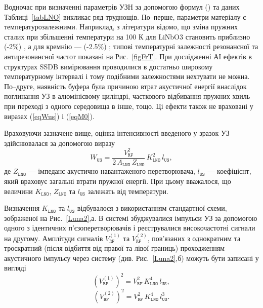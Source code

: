 Водночас при визначенні параметрів УЗН за допомогою формул () та даних Таблиці~\ref{tabLNO} викликає ряд труднощів.
По--перше, параметри матеріалу є температурозалежними.
Наприклад, з літератури відомо, що зміна пружних сталих при збільшенні температури на 100 К для LiNbO3 становить приблизно (-2\%) \cite{LNO_C:Temp},
а для кремнію --- (-2.5\%) \cite{Si_C:Temp};
типові температурні залежності резонансної та антирезонансної частот показані на Рис.~\ref{figFrT}.
При дослідженні АІ ефектів в структурах SSDB вимірювання проводилися в достатньо широкому температурному інтервалі і тому подібними залежностями нехтувати не можна.
По--друге, наявність буфера була причиною втрат акустичної енергії внаслідок поглинання УЗ в алюмінієвому циліндрі, часткового відбивання пружних хвиль
при переході з одного середовища в інше, тощо.
Ці ефекти також не враховані у виразах (\ref{eqWus}) і  (\ref{eqM0}).



Враховуючи зазначене вище, оцінка інтенсивності введеного у зразок УЗ здійснювалася за допомогою виразу
 \begin{equation}
 \label{eqWus2}
 W_\mathtt{US}=\frac{V_\mathtt{RF}^2}{2\,A_\mathtt{LNO}\,Z_\mathtt{LNO}}\,K_\mathtt{LNO}^2\,l_\mathtt{US},
 \end{equation}
де
$Z_\mathtt{LNO}$ --- імпеданс акустично навантаженого перетворювача,
$l_\mathtt{US}$ --- коефіцієнт, який враховує загальні втрати пружної енергії.
При цьому вважалося, що величини
$K_\mathtt{LNO}$, $Z_\mathtt{LNO}$ та $l_\mathtt{US}$ залежать від температури.

Визначення $K_\mathtt{LNO}$ та $l_\mathtt{US}$ відбувалося з використанням стандартної схеми,
зображеної на Рис.~\ref{Luna2},а.
В системі збуджувалися імпульси УЗ за допомогою одного з ідентичних п'єзоперетворювачів і реєструвалися
високочастотні сигнали на другому.
Амплітуди сигналів $V_\mathtt{RF}^{(1)}$ та $V_\mathtt{RF}^{(2)}$, пов'язаних з однократним та троєкратний (після відбиття від правої та лівої границь) проходженням акустичного імпульсу через систему
(див. Рис.~\ref{Luna2},б) можуть бути записані у вигляді
 \begin{equation}
 \label{eqVrf1}
 (V_\mathtt{RF}^{(1)})^2=V_\mathtt{RF}^2\,K_\mathtt{LNO}^4\,l_\mathtt{US},
 \end{equation}
 \begin{equation}
 \label{eqVrf2}
 (V_\mathtt{RF}^{(2)})^2=V_\mathtt{RF}^2\,K_\mathtt{LNO}^4\,l_\mathtt{US}^3.
 \end{equation}

